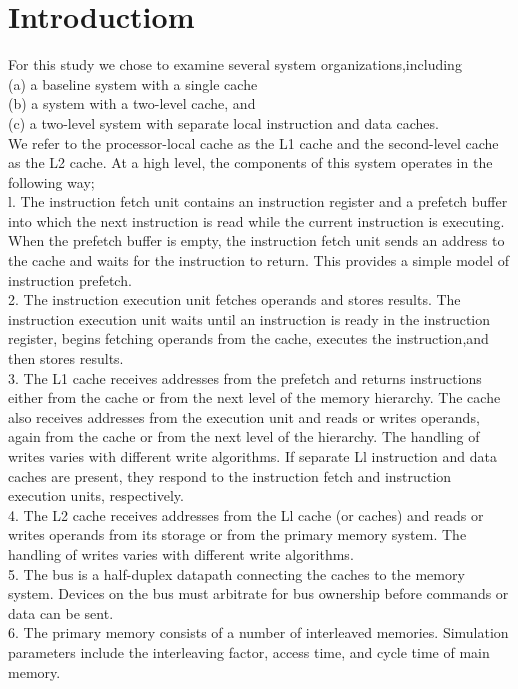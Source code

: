 \documentclass{article}
\begin{document}
\section{Introductiom}
For this study we chose to examine several system organizations,including 
\\(a) a baseline system with a single cache 
\\(b) a system with a two-level cache, and 
\\(c) a two-level system with separate local instruction and data caches. 
\bigskip
\\We refer to the processor-local cache as the L1 cache and the second-level cache as the L2 cache. At a high level, the components of this system operates in the following way;
\\l. The instruction fetch unit contains an instruction register and a prefetch buffer into which the next instruction is
read while the current instruction is executing. When the prefetch buffer is empty, the instruction fetch unit
sends an address to the cache and waits for the instruction
to return. This provides a simple model of instruction prefetch.
\\2. The instruction execution unit fetches operands and stores results. The instruction execution unit waits until an instruction
is ready in the instruction register, begins fetching operands from the cache, executes the instruction,and then stores results.
\\3. The L1 cache receives addresses from the prefetch and returns instructions either from the cache or from the next
level of the memory hierarchy. The cache also receives
addresses from the execution unit and reads or writes
operands, again from the cache or from the next level of
the hierarchy. The handling of writes varies with different
write algorithms. If separate Ll instruction and data
caches are present, they respond to the instruction fetch
and instruction execution units, respectively.
\\4. The L2 cache receives addresses from the Ll cache (or
caches) and reads or writes operands from its storage or
from the primary memory system. The handling of writes
varies with different write algorithms.
\\5. The bus is a half-duplex datapath connecting the caches
to the memory system. Devices on the bus must arbitrate
for bus ownership before commands or data can be sent.
\\6. The primary memory consists of a number of interleaved
memories. Simulation parameters include the interleaving
factor, access time, and cycle time of main memory.
\end{document}
